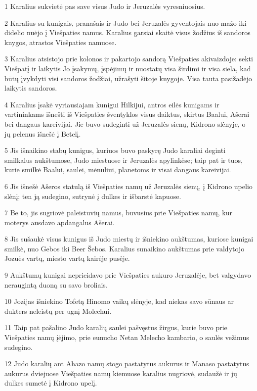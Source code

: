 \par 1 Karalius sukvietė pas save visus Judo ir Jeruzalės vyresniuosius. 
\par 2 Karalius su kunigais, pranašais ir Judo bei Jeruzalės gyventojais nuo mažo iki didelio nuėjo į Viešpaties namus. Karalius garsiai skaitė visus žodžius iš sandoros knygos, atrastos Viešpaties namuose. 
\par 3 Karalius atsistojo prie kolonos ir pakartojo sandorą Viešpaties akivaizdoje: sekti Viešpatį ir laikytis Jo įsakymų, įspėjimų ir nuostatų visa širdimi ir visa siela, kad būtų įvykdyti visi sandoros žodžiai, užrašyti šitoje knygoje. Visa tauta pasižadėjo laikytis sandoros. 
\par 4 Karalius įsakė vyriausiajam kunigui Hilkijui, antros eilės kunigams ir vartininkams išnešti iš Viešpaties šventyklos visus daiktus, skirtus Baalui, Ašerai bei dangaus kareivijai. Jie buvo sudeginti už Jeruzalės sienų, Kidrono slėnyje, o jų pelenus išnešė į Betelį. 
\par 5 Jis išnaikino stabų kunigus, kuriuos buvo paskyrę Judo karaliai deginti smilkalus aukštumose, Judo miestuose ir Jeruzalės apylinkėse; taip pat ir tuos, kurie smilkė Baalui, saulei, mėnuliui, planetoms ir visai dangaus kareivijai. 
\par 6 Jis išnešė Ašeros statulą iš Viešpaties namų už Jeruzalės sienų, į Kidrono upelio slėnį; ten ją sudegino, sutrynė į dulkes ir išbarstė kapuose. 
\par 7 Be to, jis sugriovė paleistuvių namus, buvusius prie Viešpaties namų, kur moterys ausdavo apdangalus Ašerai. 
\par 8 Jis sušaukė visus kunigus iš Judo miestų ir išniekino aukštumas, kuriose kunigai smilkė, nuo Gebos iki Beer Šebos. Karalius sunaikino aukštumas prie valdytojo Jozuės vartų, miesto vartų kairėje pusėje. 
\par 9 Aukštumų kunigai neprieidavo prie Viešpaties aukuro Jeruzalėje, bet valgydavo neraugintą duoną su savo broliais. 
\par 10 Jozijas išniekino Tofetą Hinomo vaikų slėnyje, kad niekas savo sūnaus ar dukters neleistų per ugnį Molechui. 
\par 11 Taip pat pašalino Judo karalių saulei pašvęstus žirgus, kurie buvo prie Viešpaties namų įėjimo, prie eunucho Netan Melecho kambario, o saulės vežimus sudegino. 
\par 12 Judo karalių ant Ahazo namų stogo pastatytus aukurus ir Manaso pastatytus aukurus dviejuose Viešpaties namų kiemuose karalius nugriovė, sudaužė ir jų dulkes sumetė į Kidrono upelį. 
